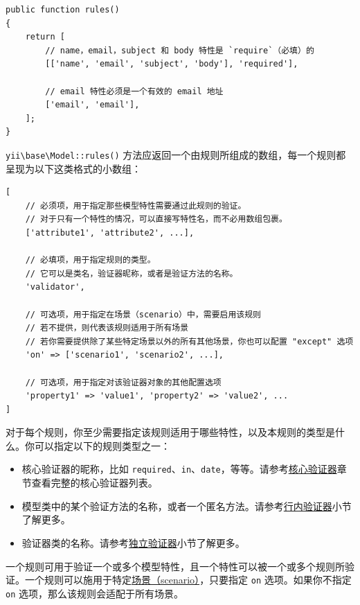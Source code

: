 \lstset{language=php}\begin{lstlisting}
public function rules()
{
    return [
        // name，email，subject 和 body 特性是 `require`（必填）的
        [['name', 'email', 'subject', 'body'], 'required'],

        // email 特性必须是一个有效的 email 地址
        ['email', 'email'],
    ];
}
\end{lstlisting}
\texttt{yii{\allowbreak{}\textbackslash}base{\allowbreak{}\textbackslash}Model\allowbreak{}::\allowbreak{}rules()} 方法应返回一个由规则所组成的数组，每一个规则都呈现为以下这类格式的小数组：

\lstset{language=php}\begin{lstlisting}
[
    // 必须项，用于指定那些模型特性需要通过此规则的验证。
    // 对于只有一个特性的情况，可以直接写特性名，而不必用数组包裹。
    ['attribute1', 'attribute2', ...],

    // 必填项，用于指定规则的类型。
    // 它可以是类名，验证器昵称，或者是验证方法的名称。
    'validator',

    // 可选项，用于指定在场景（scenario）中，需要启用该规则
    // 若不提供，则代表该规则适用于所有场景
    // 若你需要提供除了某些特定场景以外的所有其他场景，你也可以配置 "except" 选项
    'on' => ['scenario1', 'scenario2', ...],

    // 可选项，用于指定对该验证器对象的其他配置选项
    'property1' => 'value1', 'property2' => 'value2', ...
]
\end{lstlisting}
对于每个规则，你至少需要指定该规则适用于哪些特性，以及本规则的类型是什么。你可以指定以下的规则类型之一：

\begin{itemize}
\item 核心验证器的昵称，比如 \lstinline|required|、\lstinline|in|、\lstinline|date|，等等。请参考\hyperref[tutorial-core-validators.md]{核心验证器}章节查看完整的核心验证器列表。
\item 模型类中的某个验证方法的名称，或者一个匿名方法。请参考\hyperref[input-validation.md::::inline-validators]{行内验证器}小节了解更多。
\item 验证器类的名称。请参考\hyperref[input-validation.md::::standalone-validators]{独立验证器}小节了解更多。
\end{itemize}
一个规则可用于验证一个或多个模型特性，且一个特性可以被一个或多个规则所验证。一个规则可以施用于特定\hyperref[structure-models.md::scenarios]{场景（scenario）}，只要指定 \lstinline|on| 选项。如果你不指定 \lstinline|on| 选项，那么该规则会适配于所有场景。

